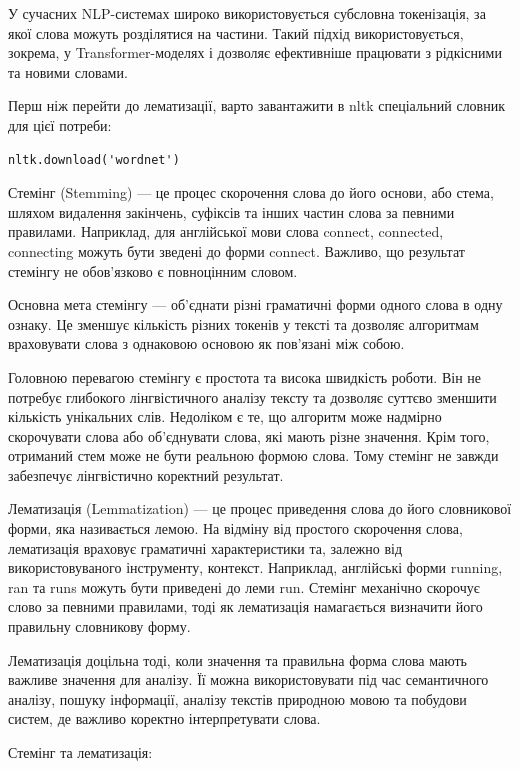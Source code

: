 У сучасних NLP-системах широко використовується субсловна токенізація, за якої слова можуть розділятися на частини. Такий підхід використовується, зокрема, у Transformer-моделях і дозволяє ефективніше працювати з рідкісними та новими словами.

Перш ніж перейти до лематизації, варто завантажити в nltk спеціальний словник для цієї потреби:

\begin{lstlisting}
nltk.download('wordnet')
\end{lstlisting}

Стемінг (Stemming) — це процес скорочення слова до його основи, або стема, шляхом видалення закінчень, суфіксів та інших частин слова за певними правилами. Наприклад, для англійської мови слова connect, connected, connecting можуть бути зведені до форми connect. Важливо, що результат стемінгу не обов'язково є повноцінним словом.

Основна мета стемінгу — об'єднати різні граматичні форми одного слова в одну ознаку. Це зменшує кількість різних токенів у тексті та дозволяє алгоритмам враховувати слова з однаковою основою як пов'язані між собою.

Головною перевагою стемінгу є простота та висока швидкість роботи. Він не потребує глибокого лінгвістичного аналізу тексту та дозволяє суттєво зменшити кількість унікальних слів. Недоліком є те, що алгоритм може надмірно скорочувати слова або об'єднувати слова, які мають різне значення. Крім того, отриманий стем може не бути реальною формою слова. Тому стемінг не завжди забезпечує лінгвістично коректний результат.

Лематизація (Lemmatization) — це процес приведення слова до його словникової форми, яка називається лемою. На відміну від простого скорочення слова, лематизація враховує граматичні характеристики та, залежно від використовуваного інструменту, контекст. Наприклад, англійські форми running, ran та runs можуть бути приведені до леми run. Стемінг механічно скорочує слово за певними правилами, тоді як лематизація намагається визначити його правильну словникову форму.

Лематизація доцільна тоді, коли значення та правильна форма слова мають важливе значення для аналізу. Її можна використовувати під час семантичного аналізу, пошуку інформації, аналізу текстів природною мовою та побудови систем, де важливо коректно інтерпретувати слова.

Стемінг та лематизація:

